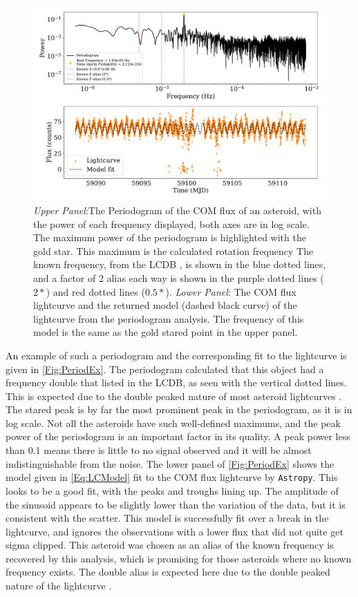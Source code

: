 \documentclass{UCreport}
\begin{document}
\begin{figure}[!t]
  \centering
  \includegraphics[width=\textwidth]{../OzData/PeriodogramUlyssesUpdated.pdf}
  \caption[Periodogram example]{\textit{Upper Panel}:The Periodogram of the COM flux of an asteroid, with the power of each frequency displayed, both axes are in log scale.
    The maximum power of the periodogram is highlighted with the gold star.
    This maximum is the calculated rotation frequency
    The known frequency, from the LCDB \citep{Warner2009}, is shown in the blue dotted lines, and a factor of 2 alias each way is shown in the purple dotted lines ($2*$) and red dotted lines ($0.5*$).
    \textit{Lower Panel}: The COM flux lightcurve and the returned model (dashed black curve) of the lightcurve from the periodogram analysis. The frequency of this model is the same as the gold stared point in the upper panel.
  }
  \label{Fig:PeriodEx}
\end{figure}


An example of such a periodogram and the corresponding fit to the lightcurve is given in \autoref{Fig:PeriodEx}.
The periodogram calculated that this object had a frequency double that listed in the LCDB, as seen with the vertical dotted lines.
This is expected due to the double peaked nature of most asteroid lightcurves \citep{McNeill2023}.
The stared peak is by far the most prominent peak in the periodogram, as it is in log scale.
Not all the asteroids have such well-defined maximums, and the peak power of the periodogram is an important factor in its quality.
A peak power less than 0.1 means there is little to no signal observed and it will be almost indistinguishable from the noise.
The lower panel of \autoref{Fig:PeriodEx} shows the model given in \autoref{Eq:LCModel} fit to the COM flux lightcurve by \texttt{Astropy}.
This looks to be a good fit, with the peaks and troughs lining up.
The amplitude of the sinusoid appears to be slightly lower than the variation of the data, but it is consistent with the scatter.
This model is successfully fit over a break in the lightcurve, and ignores the observations with a lower flux that did not quite get sigma clipped.
This asteroid was chosen as an alias of the known frequency is recovered by this analysis, which is promising for those asteroids where no known frequency exists.
The double alias is expected here due to the double peaked nature of the lightcurve \citep{McNeill2023}.
\end{document}

